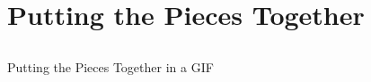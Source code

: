 \documentclass[xcolor=dvipsnames]{beamer}
\begin{document}
\section{Putting the Pieces Together}
\subsection{}
\begin{frame}{Putting the Pieces Together in a GIF}
\end{frame}

\end{document}
